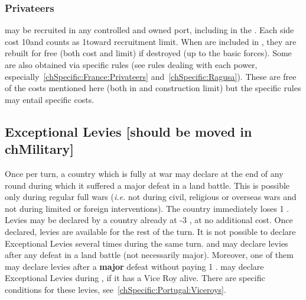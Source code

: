\subsubsection{Privateers}\label{chLogistic:Recruiting Privateers}
\aparag \corsaire may be recruited in any controlled and owned port, including
in the \ROTW.
\bparag Each side cost 10\ducats and counts as 1\ND toward recruitment limit.
\bparag When \corsaire are included in , they are rebuilt
for free (both cost and limit) if destroyed (up to the basic forces).
\bparag Some \corsaire are also obtained via specific rules (see rules dealing
with each power, especially~\ref{chSpecific:France:Privateers}
and~\ref{chSpecific:Ragusa}). These are free of the costs mentioned here (both
in \ducats and construction limit) but the specific rules may entail specific
costs.





\subsection{Exceptional Levies [should be moved in chMilitary]}
\label{chLogistic:Exceptional Levies}
\label{chMilitary:Exceptional Levies}


\bparag Once per turn, a country which is fully at war may declare
 at the end of any round during which it suffered a
major defeat in a land battle. This is possible only during regular full wars
(\emph{i.e.} not during civil, religious or overseas wars and not during
limited or foreign interventions).
\bparag The country immediately loses 1 \STAB. Levies may be declared by a
country already at -3 \STAB, at no additional cost.
\bparag Once declared, levies are available for the rest of the turn. It is
not possible to declare Exceptional Levies several times during the same
turn.
\bparag[Exception:] \SUE and \PRU may declare levies after any defeat in a land
battle (not necessarily major). Moreover, one of them may declare levies after
a \textbf{major} defeat without paying 1 \STAB.
\bparag[Exception:] \POR may declare Exceptional Levies during , if it has a Vice Roy alive. There are specific conditions for these
levies, see~\ref{chSpecific:Portugal:Viceroys}.

